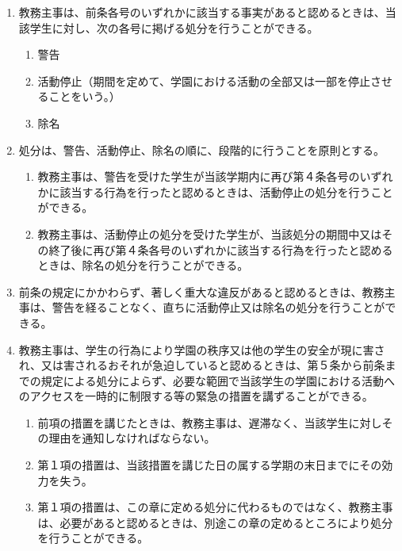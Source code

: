 \begin{enumerate}[label=第\arabic*条　]
\begin{enumerate}[label=(\arabic*)　]
        \item 学園が活動の基盤として利用する外部サービスの利用条件に違反する行為であって、学園の活動に支障を生じさせるもの
        \item 前各号に掲げるもののほか、他の学生の権利利益を著しく損なう行為
      \end{enumerate}
  \item 教務主事は、前条各号のいずれかに該当する事実があると認めるときは、当該学生に対し、次の各号に掲げる処分を行うことができる。
      \begin{enumerate}[label=(\arabic*)　]
        \item 警告
        \item 活動停止（期間を定めて、学園における活動の全部又は一部を停止させることをいう。）
        \item 除名
      \end{enumerate}
  \item 処分は、警告、活動停止、除名の順に、段階的に行うことを原則とする。
    \begin{enumerate}[label=\arabic*　,start=2,leftmargin=*]
      \item 教務主事は、警告を受けた学生が当該学期内に再び第４条各号のいずれかに該当する行為を行ったと認めるときは、活動停止の処分を行うことができる。
      \item 教務主事は、活動停止の処分を受けた学生が、当該処分の期間中又はその終了後に再び第４条各号のいずれかに該当する行為を行ったと認めるときは、除名の処分を行うことができる。
    \end{enumerate}
  \item 前条の規定にかかわらず、著しく重大な違反があると認めるときは、教務主事は、警告を経ることなく、直ちに活動停止又は除名の処分を行うことができる。
  \item 教務主事は、学生の行為により学園の秩序又は他の学生の安全が現に害され、又は害されるおそれが急迫していると認めるときは、第５条から前条までの規定による処分によらず、必要な範囲で当該学生の学園における活動へのアクセスを一時的に制限する等の緊急の措置を講ずることができる。
    \begin{enumerate}[label=\arabic*　,start=2,leftmargin=*]
      \item 前項の措置を講じたときは、教務主事は、遅滞なく、当該学生に対しその理由を通知しなければならない。
      \item 第１項の措置は、当該措置を講じた日の属する学期の末日までにその効力を失う。
      \item 第１項の措置は、この章に定める処分に代わるものではなく、教務主事は、必要があると認めるときは、別途この章の定めるところにより処分を行うことができる。

\end{enumerate}
\end{enumerate}
